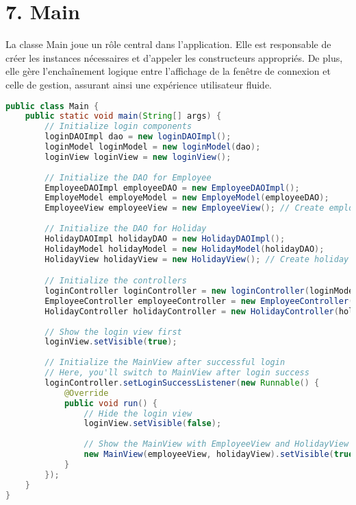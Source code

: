 \documentclass[a4paper,12pt]{report}
\begin{document}
\section*{\textcolor{myblue}{7. Main}}
La classe Main joue un rôle central dans l'application. Elle est responsable de créer les instances nécessaires et
 d'appeler les constructeurs appropriés. De plus, elle gère l'enchaînement logique entre l'affichage 
 de la fenêtre de connexion et celle de gestion, assurant ainsi une expérience utilisateur fluide.
\begin{lstlisting}[language=java, caption={Main}]
public class Main {
    public static void main(String[] args) {
        // Initialize login components
        loginDAOImpl dao = new loginDAOImpl();
        loginModel loginModel = new loginModel(dao);
        loginView loginView = new loginView();
        
        // Initialize the DAO for Employee
        EmployeeDAOImpl employeeDAO = new EmployeeDAOImpl();
        EmployeModel employeModel = new EmployeModel(employeeDAO);
        EmployeeView employeeView = new EmployeeView(); // Create employee view
        
        // Initialize the DAO for Holiday
        HolidayDAOImpl holidayDAO = new HolidayDAOImpl();
        HolidayModel holidayModel = new HolidayModel(holidayDAO);
        HolidayView holidayView = new HolidayView(); // Create holiday view

        // Initialize the controllers
        loginController loginController = new loginController(loginModel, loginView, employeeView, holidayView);
        EmployeeController employeeController = new EmployeeController(employeModel, employeeView);
        HolidayController holidayController = new HolidayController(holidayModel, holidayView);
        
        // Show the login view first
        loginView.setVisible(true);
        
        // Initialize the MainView after successful login
        // Here, you'll switch to MainView after login success
        loginController.setLoginSuccessListener(new Runnable() {
            @Override
            public void run() {
                // Hide the login view
                loginView.setVisible(false);
                
                // Show the MainView with EmployeeView and HolidayView in tabs
                new MainView(employeeView, holidayView).setVisible(true);
            }
        });
    }
}
\end{lstlisting}
\end{document}
